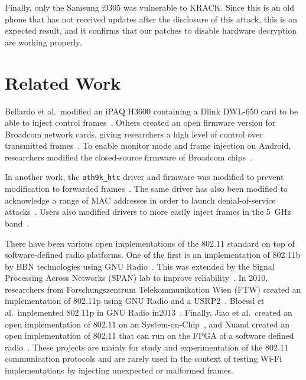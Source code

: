 \documentclass[sigconf]{acmart}
\newcommand{\wifi}{\mbox{Wi-Fi}}
\newcommand{\red}[1]{\textcolor{red}{#1}}
\begin{document}
\noindent
Finally, only the Samsung i9305 was vulnerable to KRACK.
Since this is an old phone that has not received updates after the disclosure of this attack, this is an expected result, and it confirms that our patches to disable hardware decryption are working properly.

\section{Related Work}
\label{sec:relatedwork}

Bellardo et al.\ modified an iPAQ H3600 containing a Dlink DWL-650 card to be able to inject control frames~\cite{bellardo2003802}.
Others created an open firmware version for Broadcom network cards, giving researchers a high level of control over transmitted frames~\cite{gringoliopenfwwf2010}.
To enable monitor mode and frame injection on Android, researchers modified the closed-source firmware of Broadcom chips~\cite{nexmon:project}.

In another work, the \verb|ath9k_htc| driver and firmware was modified to prevent modification to forwarded frames~\cite{vanhoef2014advanced}.
The same driver has also been modified to acknowledge a range of MAC addresses in order to launch denial-of-service attacks~\cite{vanhoef-sp2020-dragonblood}.
Users also modified drivers to more easily inject frames in the 5~GHz band~\cite{linux-ath-user-regd}.

There have been various open implementations of the 802.11 standard on top of software-defined radio platforms.
One of the first is an implementation of 802.11b by BBN technologies using GNU Radio~\cite{dobbins2011software,cgran-archive2013}.
This was extended by the Signal Processing Across Networks (SPAN) lab to improve reliability~\cite{span-802.11b,dobbins2011software}.
In 2010, researchers from Forschungszentrum Telekommunikation Wien (FTW) created an implementation of 802.11p using GNU Radio and a USRP2~\cite{fuxjager2010ieee}.
Bloessl et al.\ implemented 802.11p in GNU Radio in2013~\cite{bloessl2013towards}.
Finally, Jiao et al.\ created an open implementation of 802.11 on an System-on-Chip~\cite{jiao2020openwifi}, and Nuand created an open implementation of 802.11 that can run on the FPGA of a software defined radio~\cite{Nuand}.
These projects are mainly for study and experimentation of the 802.11 communication protocols and are rarely used in the context of testing \wifi{} implementations by injecting unexpected or malformed frames.
\end{document}
